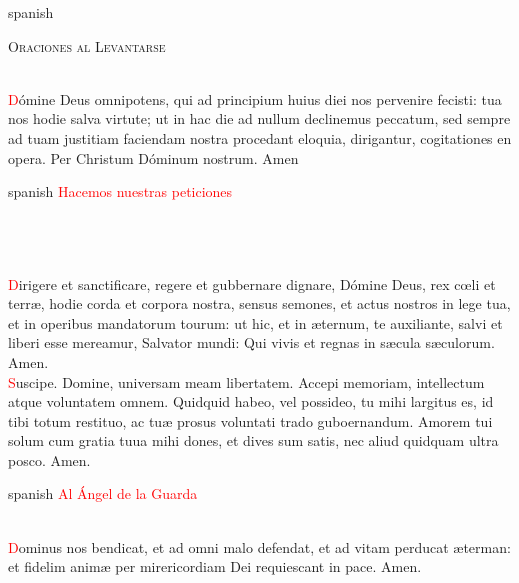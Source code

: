 \documentclass[9pt]{article}
\begin{document}
\begin{multicols*}{2}

      \begin{otherlanguage*}{spanish}
            \begin{center}
                  \textsc{\Large{Oraciones al Levantarse}}
            \end{center}
      \end{otherlanguage*}
      \\[2mm]
      \textcolor{red}{D}ómine Deus omnipotens, qui ad principium huius diei nos pervenire fecisti: tua nos hodie salva virtute; ut in hac die ad nullum declinemus peccatum, sed sempre ad tuam
      justitiam faciendam nostra procedant eloquia, dirigantur, cogitationes en opera. Per Christum Dóminum nostrum. Amen\\[1mm]
      \begin{otherlanguage*}{spanish}
            \textcolor{red}{Hacemos nuestras peticiones}\\[1mm]
      \end{otherlanguage*}
      \\[1mm]
      \\[1mm]
      \\[-3mm]
      \textcolor{red}{D}irigere et sanctificare, regere et gubbernare dignare, Dómine Deus, rex c{\oe}li et terr{\ae}, hodie corda et corpora nostra, sensus semones, et actus nostros in lege tua,
      et in operibus mandatorum tourum: ut hic, et in {\ae}ternum, te auxiliante, salvi et liberi esse mereamur, Salvator mundi: Qui vivis et regnas in s{\ae}cula s{\ae}culorum. Amen.\\[2mm]
      \textcolor{red}{S}uscipe. Domine, universam meam libertatem. Accepi memoriam, intellectum atque voluntatem omnem. Quidquid habeo, vel possideo, tu mihi largitus es, id tibi totum restituo,
      ac tu{\ae} prosus voluntati trado guboernandum. Amorem tui solum cum gratia tuua mihi dones, et dives sum satis, nec aliud quidquam ultra posco. Amen.\\[1mm]
      \begin{otherlanguage*}{spanish}
            \textcolor{red}{Al Ángel de la Guarda} 
      \end{otherlanguage*}
      \\[1mm]
      \textcolor{red}{D}ominus nos bendicat, et ad omni malo defendat, et ad vitam perducat {\ae}terman: et fidelim anim{\ae} per mirericordiam Dei requiescant in pace. Amen.

\end{multicols*}
\end{document}
